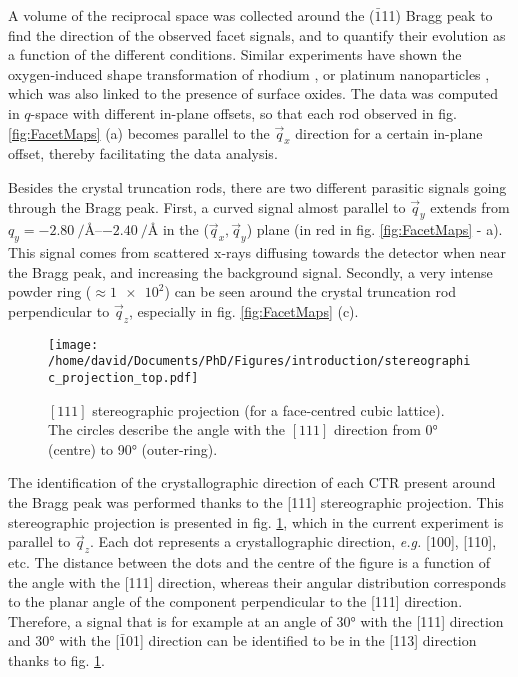 A volume of the reciprocal space was collected around the ($\bar{1}$11) Bragg peak to find the direction of the observed facet signals, and to quantify their evolution as a function of the different conditions.
Similar experiments have shown the oxygen-induced shape transformation of rhodium \parencite{Nolte2008}, or platinum nanoparticles \parencite{Hejral2013}, which was also linked to the presence of surface oxides.
The data was computed in $q$-space with different in-plane offsets, so that each rod observed in fig. \ref{fig:FacetMaps} (a) becomes parallel to the $\vec{q}_x$ direction for a certain in-plane offset, thereby facilitating the data analysis.

Besides the crystal truncation rods, there are two different parasitic signals going through the Bragg peak.
First, a curved signal almost parallel to $\vec{q}_y$ extends from $q_y = \qtyrange{-2.80}{-2.40}{\per\angstrom}$ in the ($\vec{q}_x, \vec{q}_y$) plane (in red in fig. \ref{fig:FacetMaps} - a).
This signal comes from scattered x-rays diffusing towards the detector when near the Bragg peak, and increasing the background signal.
Secondly, a very intense powder ring ($\approx \num{1e2}$) can be seen around the crystal truncation rod perpendicular to $\vec{q}_z$, especially in fig. \ref{fig:FacetMaps} (c).

\begin{figure}[!htb]
    \centering
    \texttt{[image: /home/david/Documents/PhD/Figures/introduction/stereographic\_projection\_top.pdf]}
    \caption{
        $[111]$ stereographic projection (for a face-centred cubic lattice).
        The circles describe the angle with the $[111]$ direction from \ang{0} (centre) to \ang{90} (outer-ring).
    }
    \label{fig:StereoTop}
\end{figure}

The identification of the crystallographic direction of each CTR present around the Bragg peak was performed thanks to the [111] stereographic projection.
This stereographic projection is presented in fig. \ref{fig:StereoTop}, which in the current experiment is parallel to $\vec{q}_z$.
Each dot represents a crystallographic direction, \textit{e.g.} [100], [110], etc.
The distance between the dots and the centre of the figure is a function of the angle with the [111] direction, whereas their angular distribution corresponds to the planar angle of the component perpendicular to the [111] direction.
Therefore, a signal that is for example at an angle of \ang{30} with the [111] direction and \ang{30} with the [$\bar{1}$01] direction can be identified to be in the [113] direction thanks to fig. \ref{fig:StereoTop}.

